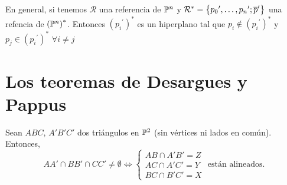 \begin{obs}
En general, si tenemos $\mathcal{R}$ una referencia de $\mathbb{P}^n$ y
$\mathcal{R}^* = \left\{{p_0}^\prime,\dots,{p_n}^\prime; \overline{p}^\prime\right\}$
una refencia de $\left( \mathbb{P}^n \right)^*$. Entonces $\left( {p_i}^\prime \right)^*$
es un hiperplano tal que $p_i \notin \left( {p_i}^\prime \right)^*$ y
$p_j \in \left( {p_i}^\prime \right)^*$ $\forall i \neq j$
\end{obs}

\section{Los teoremas de Desargues y Pappus}

\begin{teo}[de Desargues]

Sean $ABC$, $A'B'C'$ dos triángulos en $\mathbb{P}^2$ (sin vértices ni lados en común). Entonces,
\[
AA' \cap BB' \cap CC' \neq \emptyset \iff
\begin{cases}
AB \cap A'B' = Z \\
AC \cap A'C' = Y \\
BC \cap B'C' = X
\end{cases}
\text{ están alineados.}
\]


\end{teo}
